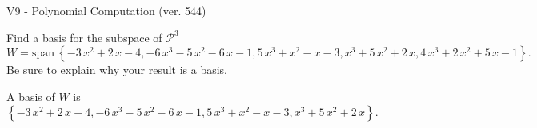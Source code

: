 \begin{exercise}
  \begin{exerciseTitle}V9 - Polynomial Computation (ver. 544)\end{exerciseTitle}
  \begin{exerciseStatement}
    Find a basis for the subspace of \(\mathcal{P}^3\) 
\[W=\mathrm{span}\ \left\{-3 \, x^{2} + 2 \, x - 4 , -6 \, x^{3} - 5 \, x^{2} - 6 \, x - 1 , 5 \, x^{3} + x^{2} - x - 3 , x^{3} + 5 \, x^{2} + 2 \, x , 4 \, x^{3} + 2 \, x^{2} + 5 \, x - 1\right\}.\]
 Be sure to explain why your result is a basis.


  \end{exerciseStatement}
  \begin{exerciseAnswer}
   A basis of \(W\) is  \(\left\{-3 \, x^{2} + 2 \, x - 4 , -6 \, x^{3} - 5 \, x^{2} - 6 \, x - 1 , 5 \, x^{3} + x^{2} - x - 3 , x^{3} + 5 \, x^{2} + 2 \, x\right\}\).
  


  \end{exerciseAnswer}
\end{exercise}
